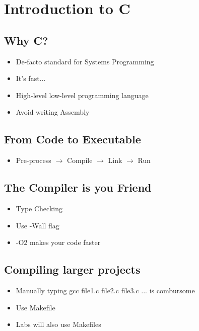 \documentclass[a4paper,11pt,english]{article}
\begin{document}


\section*{Introduction to C}
\subsection*{Why C?}
\begin{itemize}
    \item De-facto standard for Systems Programming
    \item It's fast...
    \item High-level low-level programming language
    \item Avoid writing Assembly
\end{itemize}

\subsection*{From Code to Executable}
\begin{itemize}
    \item Pre-process $\rightarrow$ Compile $\rightarrow$ Link $\rightarrow$ Run
\end{itemize}

\subsection*{The Compiler is you Friend}
\begin{itemize}
    \item{Type Checking}
    \item{Use -Wall flag}
    \item{-O2 makes your code faster}
\end{itemize}

\subsection*{Compiling larger projects}
\begin{itemize}
    \item{Manually typing gcc file1.c file2.c file3.c ... is combursome}
    \item{Use Makefile}
    \item{Labs will also use Makefiles}
\end{itemize}

\newpage
\end{document}
